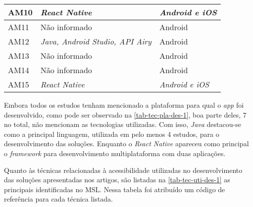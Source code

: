 \begin{table}[htb]
\begin{center}
\begin{tabular}{p{1.0cm}|p{8.0cm}|p{3.0cm}}
            \hline
            AM10            & \emph{React Native}                                              & \emph{Android e iOS} \\
            \hline
            AM11            & Não informado                                                    & Android       \\
            \hline
            AM12            & \emph{Java, Android Studio, API Airy}                            & Android       \\
            \hline
            AM13            & Não informado                                                    & Android       \\
            \hline
            AM14            & Não informado                                                    & Android       \\
            \hline
            AM15            & \emph{React Native}                                              & \emph{Android e iOS} \\
        \end{tabular}
    \end{center}
\end{table}

Embora todos os estudos tenham mencionado a plataforma para qual o \emph{app} foi desenvolvido,
como pode ser observado na \autoref{tab-tec-pla-des-1}, boa parte deles, 7 no total, não mencionam as tecnologias utilizadas.
Com isso, \emph{Java} destacou-se como a principal linguagem, utilizada em pelo menos 4 estudos, para o desenvolvimento das soluções.
Enquanto o \emph{React Native} apareceu como principal o \emph{framework} para desenvolvimento multiplataforma com duas aplicações.

\newpage

Quanto às técnicas relacionadas à acessibilidade utilizadas no desenvolvimento das soluções apresentadas nos artigos, são listadas
na \autoref{tab-tec-uti-des-1} as principais identificadas no MSL\@.
Nessa tabela foi atribuído um código de referência para cada técnica listada.

